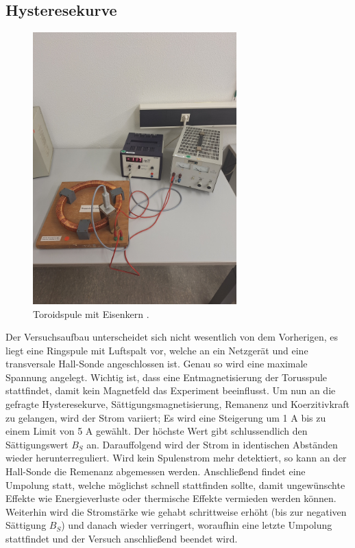 \subsection{Hysteresekurve}
\begin{figure}
    \caption{Toroidspule mit Eisenkern \cite{anleitung1}.}
    \centering
    \includegraphics[width=0.7\textwidth, angle=-90]{"Bilder/hysterese.jpg"}
\end{figure}
\noindent Der Versuchsaufbau unterscheidet sich nicht wesentlich von dem Vorherigen, 
es liegt eine Ringspule mit Luftspalt vor, welche an ein Netzgerät und eine 
transversale Hall-Sonde angeschlossen ist. Genau so wird eine maximale Spannung 
angelegt. Wichtig ist, dass eine Entmagnetisierung der Torusspule stattfindet, 
damit kein Magnetfeld das Experiment beeinflusst.
Um nun an die gefragte Hysteresekurve, Sättigungsmagnetisierung, Remanenz 
und Koerzitivkraft zu gelangen, wird der Strom variiert; Es wird eine Steigerung 
um 1 A bis zu einem Limit von 5 A gewählt. Der höchste Wert gibt schlussendlich
den Sättigungswert $B_S$ an. Darauffolgend wird der Strom in identischen 
Abständen wieder herunterreguliert. Wird kein Spulenstrom mehr detektiert, so 
kann an der Hall-Sonde die Remenanz abgemessen werden. Anschließend findet eine 
Umpolung statt, welche möglichst schnell stattfinden sollte, damit ungewünschte 
Effekte wie Energieverluste oder thermische Effekte vermieden werden können. 
Weiterhin wird die Stromstärke wie gehabt schrittweise erhöht (bis zur negativen 
Sättigung $B_S$) und danach wieder verringert, woraufhin eine letzte Umpolung 
stattfindet und der Versuch anschließend beendet wird.

